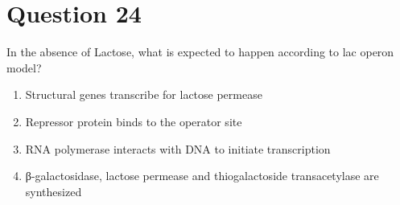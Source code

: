 \documentclass{article}
\begin{document}
\section*{Question 24}
In the absence of Lactose, what is expected to happen according to lac operon model?
\begin{enumerate}[label=(\alph*)]
\item Structural genes transcribe for lactose permease
\item Repressor protein binds to the operator site
\item RNA polymerase interacts with DNA to initiate transcription
\item β-galactosidase, lactose permease and thiogalactoside transacetylase are synthesized
\end{enumerate}
\newpage
\end{document}
